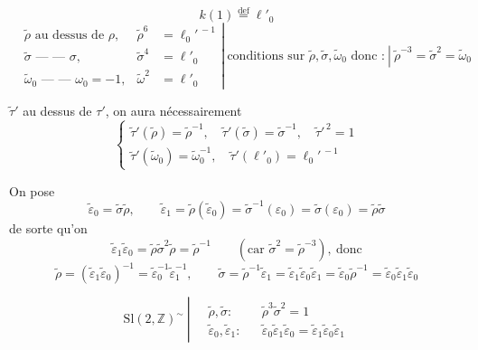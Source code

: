 \documentclass[11pt,a4paper]{article}
\begin{document}
\[
k(1) \overset{\mathrm{def}}{=} \ell'_0
\]
\[
\left.
\begin{aligned}
&\tilde{\rho} \text{ au dessus de } \rho, & \tilde{\rho}^{6} &= \ell_0'^{\,-1} \\
&\tilde{\sigma} \text{ — — } \sigma, & \tilde{\sigma}^{4} &= \ell'_0 \\
&\tilde{\omega}_0 \text{ — — } \omega_0 = -1, & \tilde{\omega}^{2} &= \ell'_0
\end{aligned}
\right|
\ \text{conditions sur } \tilde{\rho}, \tilde{\sigma}, \tilde{\omega}_0 \text{ donc :}
\ \left|\ \tilde{\rho}^{-3} = \tilde{\sigma}^{2} = \tilde{\omega}_0 \right.
\]

$\tilde{\tau}'$ au dessus de $\tau'$, on aura nécessairement
\[
\begin{cases}
\tilde{\tau}'(\tilde{\rho}) = \tilde{\rho}^{-1}, \quad \tilde{\tau}'(\tilde{\sigma}) = \tilde{\sigma}^{-1}, \quad \tilde{\tau}'^{\,2} = 1 \\
\tilde{\tau}'(\tilde{\omega}_0) = \tilde{\omega}_0^{-1}, \quad \tilde{\tau}'(\ell'_0) = \ell_0'^{\,-1}
\end{cases}
\]


On pose
\[
\tilde{\varepsilon}_0 = \tilde{\sigma}\tilde{\rho}, \qquad
\tilde{\varepsilon}_1 = \tilde{\rho}(\tilde{\varepsilon}_0) = \tilde{\sigma}^{-1}(\varepsilon_0) = \tilde{\sigma}(\varepsilon_0) = \tilde{\rho}\tilde{\sigma}
\]
de sorte qu'on 
\[
\tilde{\varepsilon}_1\tilde{\varepsilon}_0 = \tilde{\rho}\tilde{\sigma}^2\tilde{\rho} = \tilde{\rho}^{-1} \qquad (\text{car } \tilde{\sigma}^2 = \tilde{\rho}^{-3}), \ \text{donc}
\]
\[
\tilde{\rho} = (\tilde{\varepsilon}_1\tilde{\varepsilon}_0)^{-1} = \tilde{\varepsilon}_0^{-1}\tilde{\varepsilon}_1^{-1}, \qquad
\tilde{\sigma} = \tilde{\rho}^{-1}\tilde{\varepsilon}_1 = \tilde{\varepsilon}_1\tilde{\varepsilon}_0\tilde{\varepsilon}_1 = \tilde{\varepsilon}_0\tilde{\rho}^{-1} = \tilde{\varepsilon}_0\tilde{\varepsilon}_1\tilde{\varepsilon}_0
\]

\[
\mathrm{Sl}(2,\mathbb{Z})^{\sim} \ \left|\
\begin{aligned}
&\tilde{\rho}, \tilde{\sigma} : && \tilde{\rho}^3\tilde{\sigma}^2 = 1 \\
&\tilde{\varepsilon}_0, \tilde{\varepsilon}_1 : && \boxed{\tilde{\varepsilon}_0\tilde{\varepsilon}_1\tilde{\varepsilon}_0 = \tilde{\varepsilon}_1\tilde{\varepsilon}_0\tilde{\varepsilon}_1}
\end{aligned}
\right.
\]
\end{document}
